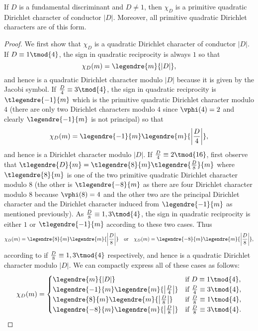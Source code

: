     \begin{theorem}\label{thm:fundamental_discriminant_character_primitive}
      If $D$ is a fundamental discriminant and $D \neq 1$, then $\chi_{D}$ is a primitive quadratic Dirichlet character of conductor $|D|$. Moreover, all primitive quadratic Dirichlet characters are of this form.
    \end{theorem}
    \begin{proof}
      We first show that $\chi_{D}$ is a quadratic Dirichlet character of conductor $|D|$. If $D \equiv 1 \tmod{4}$, the sign in quadratic reciprocity is always $1$ so that
      \[
        \chi_{D}(m) = \legendre{m}{|D|},
      \]
      and hence is a quadratic Dirichlet character modulo $|D|$ because it is given by the Jacobi symbol. If $\frac{D}{4} \equiv 3 \tmod{4}$, the sign in quadratic reciprocity is $\tlegendre{-1}{m}$ which is the primitive quadratic Dirichlet character modulo $4$ (there are only two Dirichlet characters modulo $4$ since $\vphi(4) = 2$ and clearly $\legendre{-1}{m}$ is not principal) so that
      \[
        \chi_{D}(m) = \legendre{-1}{m}\legendre{m}{\left|\frac{D}{4}\right|},
      \]
      and hence is a Dirichlet character modulo $|D|$. If $\frac{D}{4} \equiv 2 \tmod{16}$, first observe that $\tlegendre{D}{m} = \tlegendre{8}{m}\tlegendre{\frac{D}{8}}{m}$ where $\tlegendre{8}{m}$ is one of the two primitive quadratic Dirichlet character modulo $8$ (the other is $\tlegendre{-8}{m}$ as there are four Dirichlet character modulo $8$ because $\vphi(8) = 4$ and the other two are the principal Dirichlet character and the Dirichlet character induced from $\legendre{-1}{m}$ as mentioned previously). As $\frac{D}{8} \equiv 1,3 \tmod{4}$, the sign in quadratic reciprocity is either $1$ or $\tlegendre{-1}{m}$ according to these two cases. Thus
      \[
        \chi_{D}(m) = \legendre{8}{m}\legendre{m}{\left|\frac{D}{8}\right|} \quad \text{or} \quad \chi_{D}(m) = \legendre{-8}{m}\legendre{m}{\left|\frac{D}{8}\right|},
      \]
      according to if $\frac{D}{8} \equiv 1,3 \tmod{4}$ respectively, and hence is a quadratic Dirichlet character modulo $|D|$. We can compactly express all of these cases as follows:
      \[
        \chi_{D}(m) = \begin{cases} \legendre{m}{|D|} & \text{if $D \equiv 1 \tmod{4}$}, \\ \legendre{-1}{m}\legendre{m}{\left|\frac{D}{4}\right|} & \text{if $\frac{D}{4} \equiv 3 \tmod{4}$}, \\ \legendre{8}{m}\legendre{m}{\left|\frac{D}{8}\right|} & \text{if $\frac{D}{8} \equiv 1 \tmod{4}$}, \\ \legendre{-8}{m}\legendre{m}{\left|\frac{D}{8}\right|} & \text{if $\frac{D}{8} \equiv 3 \tmod{4}$}. \end{cases}
\]
\end{proof}
